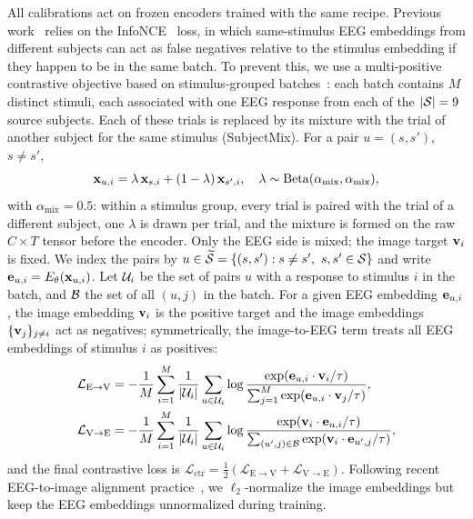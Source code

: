 \documentclass[10pt,twocolumn,letterpaper]{article}
\begin{document}
All calibrations act on frozen encoders trained with the same recipe. Previous work~\cite{song2024nice,li2024atm,wu2025ubp,zhang2025neurobridge,du2025shallow} relies on the InfoNCE~\cite{oord2019cpc} loss, in which same-stimulus EEG embeddings from different subjects can act as false negatives relative to the stimulus embedding if they happen to be in the same batch. To prevent this, we use a multi-positive contrastive objective based on stimulus-grouped batches~\cite{khosla2020supcon}: each batch contains $M$ distinct stimuli, each associated with one EEG response from each of the $|{\cal S}|=9$ source subjects. Each of these trials is replaced by its mixture with the trial of another subject for the same stimulus (SubjectMix). For a pair $u=(s,s')$, $s \neq s'$,
\begin{equation}\label{eq:subjmix}
  {\bf x}_{u,i} = \lambda\,{\bf x}_{s,i} + (1 - \lambda)\,{\bf x}_{s',i},
  \quad \lambda \sim \mathrm{Beta}(\alpha_{\mathrm{mix}}, \alpha_{\mathrm{mix}}),
\end{equation}
with $\alpha_{\mathrm{mix}}=0.5$: within a stimulus group, every trial is paired with the trial of a different subject, one $\lambda$ is drawn per trial, and the mixture is formed on the raw $C\times T$ tensor before the encoder. Only the EEG side is mixed; the image target ${\bf v}_i$ is fixed. We index the pairs by $u \in \widetilde{{\cal S}} = \{(s,s') : s \neq s',\ s,s' \in {\cal S}\}$ and write ${\bf e}_{u,i} = E_\theta({\bf x}_{u,i})$. Let ${\cal U}_i$ be the set of pairs $u$ with a response to stimulus $i$ in the batch, and ${\cal B}$ the set of all $(u,j)$ in the batch. For a given EEG embedding ${\bf e}_{u,i}$, the image embedding ${\bf v}_i$ is the positive target and the image embeddings $\{{\bf v}_j\}_{j\neq i}$ act as negatives; symmetrically, the image-to-EEG term treats all EEG embeddings of stimulus $i$ as positives:
\begin{align}
\mathcal{L}_{\mathrm{E \to V}} &=
-\frac{1}{M} \sum_{i=1}^{M} \frac{1}{|{\cal U}_i|}\sum_{u\in{\cal U}_i}
\log \frac{\exp({\bf e}_{u,i} \cdot {\bf v}_{i} / \tau)}{\sum_{j=1}^{M} \exp({\bf e}_{u,i} \cdot {\bf v}_{j} / \tau)}, \\
\mathcal{L}_{\mathrm{V \to E}} &=
-\frac{1}{M} \sum_{i=1}^{M} \frac{1}{|{\cal U}_i|}\sum_{u\in{\cal U}_i}
\log \frac{\exp({\bf v}_{i} \cdot {\bf e}_{u,i} / \tau)}{\sum_{(u',j)\in{\cal B}} \exp({\bf v}_{i} \cdot {\bf e}_{u',j} / \tau)},
\end{align}
and the final contrastive loss is $\mathcal{L}_{\mathrm{ctr}} = \frac{1}{2} ( \mathcal{L}_{\mathrm{E \to V}} + \mathcal{L}_{\mathrm{V \to E}} )$. Following recent EEG-to-image alignment practice~\cite{kneeland2025enigma,zhang2025neurobridge}, we $\ell_2$-normalize the image embeddings but keep the EEG embeddings unnormalized during training.
\end{document}
